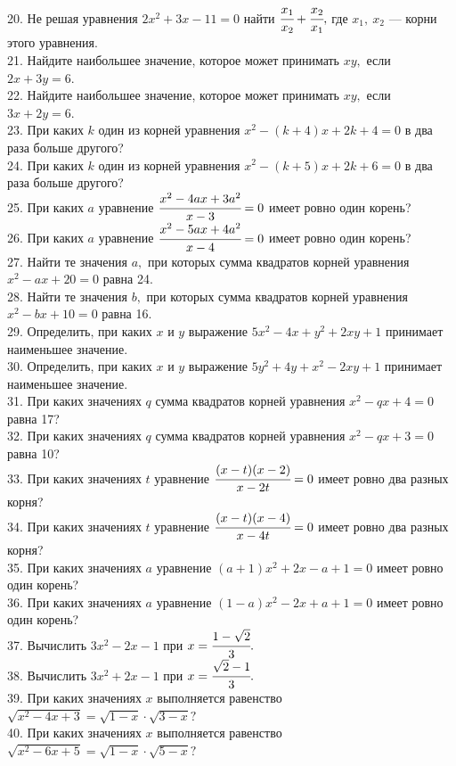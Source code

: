 \documentclass[12pt]{article}
\begin{document}
20. Не решая уравнения $2x^2+3x-11=0$ найти $\cfrac{x_1}{x_2}+\cfrac{x_2}{x_1},$ где $x_1,\ x_2$ --- корни этого уравнения.\\
21. Найдите наибольшее значение, которое может принимать $xy,$ если $2x+3y=6.$\\
22. Найдите наибольшее значение, которое может принимать $xy,$ если $3x+2y=6.$\\
23. При каких $k$ один из корней уравнения $x^2-(k+4)x+2k+4=0$ в два раза больше другого?\\
24. При каких $k$ один из корней уравнения $x^2-(k+5)x+2k+6=0$ в два раза больше другого?\\
25. При каких $a$ уравнение $\cfrac{x^2-4ax+3a^2}{x-3}=0$ имеет ровно один корень?\\
26. При каких $a$ уравнение $\cfrac{x^2-5ax+4a^2}{x-4}=0$ имеет ровно один корень?\\
27. Найти те значения $a,$ при которых сумма квадратов корней уравнения $x^2-ax+20=0$ равна 24.\\
28. Найти те значения $b,$ при которых сумма квадратов корней уравнения $x^2-bx+10=0$ равна 16.\\
29. Определить, при каких $x$ и $y$ выражение $5x^2-4x+y^2+2xy+1$ принимает наименьшее значение.\\
30. Определить, при каких $x$ и $y$ выражение $5y^2+4y+x^2-2xy+1$ принимает наименьшее значение.\\
31. При каких значениях $q$ сумма квадратов корней уравнения $x^2-qx+4=0$ равна 17?\\
32. При каких значениях $q$ сумма квадратов корней уравнения $x^2-qx+3=0$ равна 10?\\
33. При каких значениях $t$ уравнение $\cfrac{(x-t)(x-2)}{x-2t}=0$ имеет ровно два разных корня?\\
34. При каких значениях $t$ уравнение $\cfrac{(x-t)(x-4)}{x-4t}=0$ имеет ровно два разных корня?\\
35. При каких значениях $a$ уравнение $(a+1)x^2+2x-a+1=0$ имеет ровно один корень?\\
36. При каких значениях $a$ уравнение $(1-a)x^2-2x+a+1=0$ имеет ровно один корень?\\
37. Вычислить $3x^2-2x-1$ при $x=\cfrac{1-\sqrt{2}}{3}.$\\
38. Вычислить $3x^2+2x-1$ при $x=\cfrac{\sqrt{2}-1}{3}.$\\
39. При каких значениях $x$ выполняется равенство $\sqrt{x^2-4x+3}=\sqrt{1-x}\cdot\sqrt{3-x}?$\\
40. При каких значениях $x$ выполняется равенство $\sqrt{x^2-6x+5}=\sqrt{1-x}\cdot\sqrt{5-x}?$\\
\end{document}
